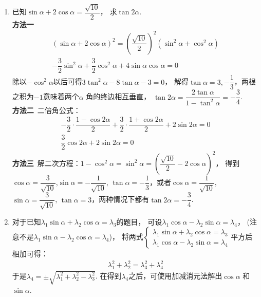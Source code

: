 \begin{enumerate}[label={【\textbf{例\thechapter.\arabic*}】},
 leftmargin=\inteval{\myenumleftmargin}pt,
 itemsep=\inteval{\myenumitempsep}pt,
 itemindent=\inteval{\myenumitemindent}pt]
\item \label{求tan2a例题}已知$ \sin\alpha+2\cos\alpha=\dfrac{\sqrt{10}}{2} $，
求$ \tan2\alpha $. \\
\textbf{方法一}\ 
\begin{gather*}
    (\sin\alpha+2\cos\alpha)^2=\left(\dfrac{\sqrt{10}}{2} \right)^2(\sin^2\alpha+\cos^2\alpha)  \\
    -\dfrac{3}{2}\sin^2\alpha+\dfrac{3}{2}\cos^2\alpha+4\sin\alpha \cos\alpha=0  
\end{gather*}
除以$ -\cos^2\alpha $以后可得$ 3\tan^2\alpha-8\tan\alpha-3=0 $，
解得$ \tan\alpha=3,-\dfrac{1}{3} $，两根之积为$ -1 $意味着两个$ \alpha $ 
角的终边相互垂直， $\tan2\alpha=\dfrac{2\tan \alpha}{1-\tan^2\alpha}=-\dfrac{3}{4} $. \\
\textbf{方法二}\ 二倍角公式：
\begin{gather*}
    -\dfrac{3}{2}\cdot\dfrac{1-\cos2\alpha}{2}+\dfrac{3}{2}\cdot\dfrac{1+\cos2\alpha}{2}
    +2\sin2\alpha=0  \\
    \dfrac{3}{2}\cos2\alpha+2\sin2\alpha=0 
\end{gather*}
\textbf{方法三}\ 解二次方程：$ 1-\cos^2\alpha=\sin^2\alpha=
\left(\dfrac{\sqrt{10}}{2}-2\cos\alpha \right)^2 $，
得到$ \cos\alpha=\dfrac{3}{\sqrt{10}} $,$ \sin\alpha=-\dfrac{1}{\sqrt{10}} $, $\tan\alpha=-\dfrac{1}{3} $，或者$ \cos\alpha=\dfrac{1}{\sqrt{10}}$, $\sin\alpha=\dfrac{3}{\sqrt{10}}$, $\tan\alpha=3 $，两种情况下都有$ \tan2\alpha=-\dfrac{3}{4} $. 

\item 对于已知$ \lambda_1\sin\alpha+\lambda_2\cos\alpha=\lambda_3 $的题目，
可设$ \lambda_1\cos\alpha-\lambda_2\sin\alpha=\lambda_4 $，
(注意不是$ \lambda_1\sin\alpha-\lambda_2\cos\alpha=\lambda_4 $)，
将两式$ \begin{cases}
    \lambda_1\sin\alpha+\lambda_2\cos\alpha=\lambda_3 \\
    \lambda_1\cos\alpha-\lambda_2\sin\alpha=\lambda_4
\end{cases} $平方后相加可得：
\begin{gather*}
    \lambda_1^2+\lambda_2^2=\lambda_3^2+\lambda_4^2 
\end{gather*}
于是$ \lambda_4=\pm \sqrt{\lambda_1^2+\lambda_2^2-\lambda_3^2} $. 
在得到$ \lambda_4 $之后，可使用加减消元法解出$ \cos\alpha$ 和 $\sin\alpha $. \\


\end{enumerate}
